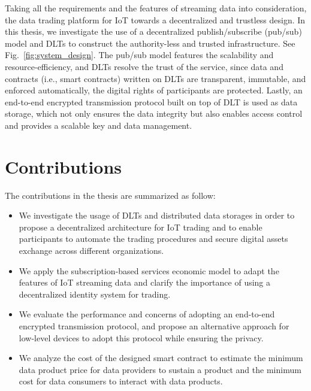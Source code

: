 \begin{spacing}{2.0}
Taking all the requirements and the features of streaming data into consideration, the data trading platform for IoT towards a decentralized and trustless design. In this thesis, we investigate the use of a decentralized publish/subscribe (pub/sub) model and DLTs to construct the authority-less and trusted infrastructure. See Fig.~\ref{fig:system_design}. The pub/sub model features the scalability and resource-efficiency, and DLTs resolve the trust of the service, since data and contracts (i.e., smart contracts) written on DLTs are transparent, immutable, and enforced automatically, the digital rights of participants are protected. Lastly, an end-to-end encrypted transmission protocol built on top of DLT is used as data storage, which not only ensures the data integrity but also enables access control and provides a scalable key and data management.

\section{Contributions}
The contributions in the thesis are summarized as follow:
\begin{itemize}
    \item We investigate the usage of DLTs and distributed data storages in order to propose a decentralized architecture for IoT trading and to enable participants to automate the trading procedures and secure digital assets exchange across different organizations.
    \item We apply the subscription-based services economic model to adapt the features of IoT streaming data and clarify the importance of using a decentralized identity system for trading.
    \item We evaluate the performance and concerns of adopting an end-to-end encrypted transmission protocol, and propose an alternative approach for low-level devices to adopt this protocol while ensuring the privacy.
    \item We analyze the cost of the designed smart contract to estimate the minimum data product price for data providers to sustain a product and the minimum cost for data consumers to interact with data products.
\end{itemize}
\clearpage


\end{spacing}
